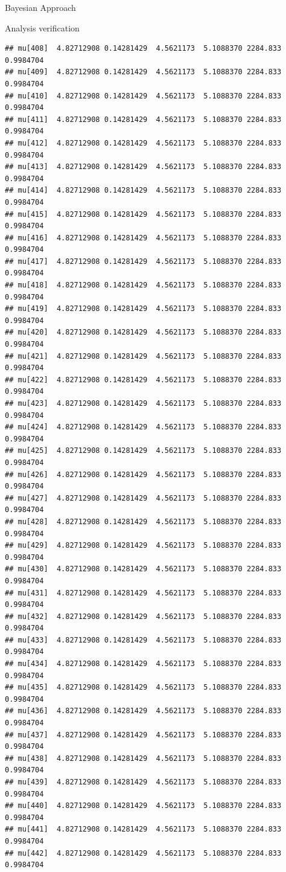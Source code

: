 \documentclass[
  ignorenonframetext,
]{beamer}
\begin{document}
\begin{frame}[fragile]{Bayesian Approach}
\begin{block}{Analysis verification}
\begin{verbatim}
## mu[408]  4.82712908 0.14281429  4.5621173  5.1088370 2284.833 0.9984704
## mu[409]  4.82712908 0.14281429  4.5621173  5.1088370 2284.833 0.9984704
## mu[410]  4.82712908 0.14281429  4.5621173  5.1088370 2284.833 0.9984704
## mu[411]  4.82712908 0.14281429  4.5621173  5.1088370 2284.833 0.9984704
## mu[412]  4.82712908 0.14281429  4.5621173  5.1088370 2284.833 0.9984704
## mu[413]  4.82712908 0.14281429  4.5621173  5.1088370 2284.833 0.9984704
## mu[414]  4.82712908 0.14281429  4.5621173  5.1088370 2284.833 0.9984704
## mu[415]  4.82712908 0.14281429  4.5621173  5.1088370 2284.833 0.9984704
## mu[416]  4.82712908 0.14281429  4.5621173  5.1088370 2284.833 0.9984704
## mu[417]  4.82712908 0.14281429  4.5621173  5.1088370 2284.833 0.9984704
## mu[418]  4.82712908 0.14281429  4.5621173  5.1088370 2284.833 0.9984704
## mu[419]  4.82712908 0.14281429  4.5621173  5.1088370 2284.833 0.9984704
## mu[420]  4.82712908 0.14281429  4.5621173  5.1088370 2284.833 0.9984704
## mu[421]  4.82712908 0.14281429  4.5621173  5.1088370 2284.833 0.9984704
## mu[422]  4.82712908 0.14281429  4.5621173  5.1088370 2284.833 0.9984704
## mu[423]  4.82712908 0.14281429  4.5621173  5.1088370 2284.833 0.9984704
## mu[424]  4.82712908 0.14281429  4.5621173  5.1088370 2284.833 0.9984704
## mu[425]  4.82712908 0.14281429  4.5621173  5.1088370 2284.833 0.9984704
## mu[426]  4.82712908 0.14281429  4.5621173  5.1088370 2284.833 0.9984704
## mu[427]  4.82712908 0.14281429  4.5621173  5.1088370 2284.833 0.9984704
## mu[428]  4.82712908 0.14281429  4.5621173  5.1088370 2284.833 0.9984704
## mu[429]  4.82712908 0.14281429  4.5621173  5.1088370 2284.833 0.9984704
## mu[430]  4.82712908 0.14281429  4.5621173  5.1088370 2284.833 0.9984704
## mu[431]  4.82712908 0.14281429  4.5621173  5.1088370 2284.833 0.9984704
## mu[432]  4.82712908 0.14281429  4.5621173  5.1088370 2284.833 0.9984704
## mu[433]  4.82712908 0.14281429  4.5621173  5.1088370 2284.833 0.9984704
## mu[434]  4.82712908 0.14281429  4.5621173  5.1088370 2284.833 0.9984704
## mu[435]  4.82712908 0.14281429  4.5621173  5.1088370 2284.833 0.9984704
## mu[436]  4.82712908 0.14281429  4.5621173  5.1088370 2284.833 0.9984704
## mu[437]  4.82712908 0.14281429  4.5621173  5.1088370 2284.833 0.9984704
## mu[438]  4.82712908 0.14281429  4.5621173  5.1088370 2284.833 0.9984704
## mu[439]  4.82712908 0.14281429  4.5621173  5.1088370 2284.833 0.9984704
## mu[440]  4.82712908 0.14281429  4.5621173  5.1088370 2284.833 0.9984704
## mu[441]  4.82712908 0.14281429  4.5621173  5.1088370 2284.833 0.9984704
## mu[442]  4.82712908 0.14281429  4.5621173  5.1088370 2284.833 0.9984704

\end{verbatim}
\end{block}
\end{frame}
\end{document}
